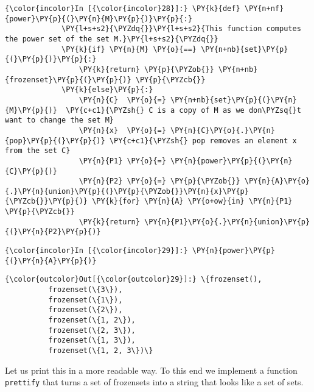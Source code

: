 \begin{Verbatim}[commandchars=\\\{\}]
{\color{incolor}In [{\color{incolor}28}]:} \PY{k}{def} \PY{n+nf}{power}\PY{p}{(}\PY{n}{M}\PY{p}{)}\PY{p}{:}
             \PY{l+s+s2}{\PYZdq{}}\PY{l+s+s2}{This function computes the power set of the set M.}\PY{l+s+s2}{\PYZdq{}}
             \PY{k}{if} \PY{n}{M} \PY{o}{==} \PY{n+nb}{set}\PY{p}{(}\PY{p}{)}\PY{p}{:}
                 \PY{k}{return} \PY{p}{\PYZob{}} \PY{n+nb}{frozenset}\PY{p}{(}\PY{p}{)} \PY{p}{\PYZcb{}}
             \PY{k}{else}\PY{p}{:}
                 \PY{n}{C}  \PY{o}{=} \PY{n+nb}{set}\PY{p}{(}\PY{n}{M}\PY{p}{)}  \PY{c+c1}{\PYZsh{} C is a copy of M as we don\PYZsq{}t want to change the set M}
                 \PY{n}{x}  \PY{o}{=} \PY{n}{C}\PY{o}{.}\PY{n}{pop}\PY{p}{(}\PY{p}{)} \PY{c+c1}{\PYZsh{} pop removes an element x from the set C}
                 \PY{n}{P1} \PY{o}{=} \PY{n}{power}\PY{p}{(}\PY{n}{C}\PY{p}{)}
                 \PY{n}{P2} \PY{o}{=} \PY{p}{\PYZob{}} \PY{n}{A}\PY{o}{.}\PY{n}{union}\PY{p}{(}\PY{p}{\PYZob{}}\PY{n}{x}\PY{p}{\PYZcb{}}\PY{p}{)} \PY{k}{for} \PY{n}{A} \PY{o+ow}{in} \PY{n}{P1} \PY{p}{\PYZcb{}}
                 \PY{k}{return} \PY{n}{P1}\PY{o}{.}\PY{n}{union}\PY{p}{(}\PY{n}{P2}\PY{p}{)}
\end{Verbatim}


\begin{Verbatim}[commandchars=\\\{\}]
{\color{incolor}In [{\color{incolor}29}]:} \PY{n}{power}\PY{p}{(}\PY{n}{A}\PY{p}{)}
\end{Verbatim}


\begin{Verbatim}[commandchars=\\\{\}]
{\color{outcolor}Out[{\color{outcolor}29}]:} \{frozenset(),
          frozenset(\{3\}),
          frozenset(\{1\}),
          frozenset(\{2\}),
          frozenset(\{1, 2\}),
          frozenset(\{2, 3\}),
          frozenset(\{1, 3\}),
          frozenset(\{1, 2, 3\})\}
\end{Verbatim}
Let us print this in a more readable way. To this end we implement a
function \texttt{prettify} that turns a set of frozensets into a string that
looks like a set of sets.

